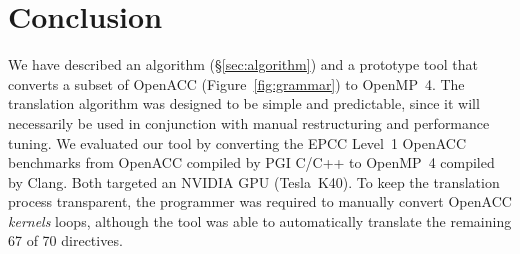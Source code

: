 \documentclass{sig-alternate-05-2015}
\begin{document}
\section{Conclusion}

We have described an algorithm (\S\ref{sec:algorithm}) and a prototype tool
that converts a subset of OpenACC (Figure~\ref{fig:grammar}) to OpenMP~4.  The
translation algorithm was designed to be simple and predictable, since it will
necessarily be used in conjunction with manual restructuring and performance
tuning.  We evaluated our tool by converting the EPCC Level~1 OpenACC
benchmarks from OpenACC compiled by PGI C/C++ to OpenMP~4 compiled by Clang.
Both targeted an NVIDIA GPU (Tesla~K40).  To keep the translation process
transparent, the programmer was required to manually convert OpenACC
\emph{kernels} loops, although the tool was able to automatically translate the
remaining 67 of 70 directives.


\balance
%


%
%
\end{document}
